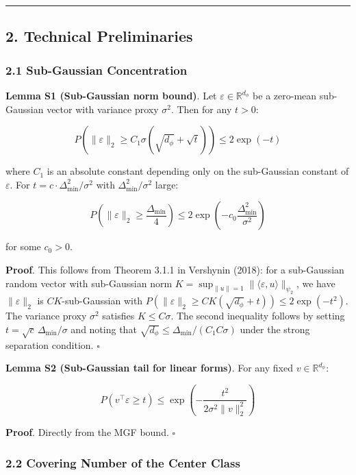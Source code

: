 \documentclass[
  12pt,
]{ctexart}
\begin{document}
\begin{center}\rule{0.5\linewidth}{0.5pt}\end{center}

\subsection{2. Technical Preliminaries}\label{technical-preliminaries}

\subsubsection{2.1 Sub-Gaussian
Concentration}\label{sub-gaussian-concentration}

\textbf{Lemma S1 (Sub-Gaussian norm bound)}. Let
\(\varepsilon \in \mathbb{R}^{d_\phi}\) be a zero-mean sub-Gaussian
vector with variance proxy \(\sigma^2\). Then for any \(t > 0\):

\[P\left(\|\varepsilon\|_2 \geq C_1 \sigma \left(\sqrt{d_\phi} + \sqrt{t}\right)\right) \leq 2 \exp(-t)\]

where \(C_1\) is an absolute constant depending only on the sub-Gaussian
constant of \(\varepsilon\). For
\(t = c \cdot \Delta_{\min}^2 / \sigma^2\) with
\(\Delta_{\min}^2 / \sigma^2\) large:

\[P\left(\|\varepsilon\|_2 \geq \frac{\Delta_{\min}}{4}\right) \leq 2 \exp\left(-c_0 \frac{\Delta_{\min}^2}{\sigma^2}\right)\]

for some \(c_0 > 0\).

\textbf{Proof}. This follows from Theorem 3.1.1 in Vershynin (2018): for
a sub-Gaussian random vector with sub-Gaussian norm
\(K = \sup_{\|u\|=1} \|\langle \varepsilon, u\rangle\|_{\psi_2}\), we
have \(\|\varepsilon\|_2\) is \(C K\)-sub-Gaussian with
\(P(\|\varepsilon\|_2 \geq C K (\sqrt{d_\phi} + t)) \leq 2\exp(-t^2)\).
The variance proxy \(\sigma^2\) satisfies \(K \leq C\sigma\). The second
inequality follows by setting \(t = \sqrt{c}\,\Delta_{\min}/\sigma\) and
noting that \(\sqrt{d_\phi} \leq \Delta_{\min}/(C_1 C \sigma)\) under
the strong separation condition. \(\square\)

\textbf{Lemma S2 (Sub-Gaussian tail for linear forms)}. For any fixed
\(v \in \mathbb{R}^{d_\phi}\):

\[P\left(v^\top \varepsilon \geq t\right) \leq \exp\left(-\frac{t^2}{2\sigma^2 \|v\|_2^2}\right)\]

\textbf{Proof}. Directly from the MGF bound. \(\square\)

\subsubsection{2.2 Covering Number of the Center
Class}\label{covering-number-of-the-center-class}
\end{document}
